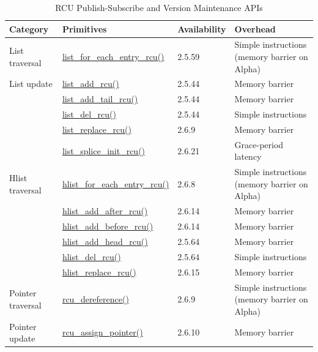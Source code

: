 \begin{table}[tb]
\begin{center}
\begin{tabular}{p{1.1in}|p{1.9in}|p{0.7in}|p{1.3in}}
Category &
	Primitives &
		Availability &
			Overhead \\
\hline
\hline
List traversal &
	\url{list_for_each_entry_rcu()} &
		2.5.59 &
			{ \raggedright
			  Simple instructions (memory barrier on Alpha) } \\
\hline
List update &
	\url{list_add_rcu()} &
		2.5.44 &
			Memory barrier \\
&
	\url{list_add_tail_rcu()} &
		2.5.44 &
			Memory barrier \\
&
	\url{list_del_rcu()} &
		2.5.44 &
			Simple instructions \\
&
	\url{list_replace_rcu()} &
		2.6.9 &
			Memory barrier \\
&
	\url{list_splice_init_rcu()} &
		2.6.21 &
			Grace-period latency \\
\hline
Hlist traversal &
	\url{hlist_for_each_entry_rcu()} &
		2.6.8 &
			{ \raggedright
			  Simple instructions (memory barrier on Alpha) } \\
&
	\url{hlist_add_after_rcu()} &
		2.6.14 &
			Memory barrier \\
&
	\url{hlist_add_before_rcu()} &
		2.6.14 &
			Memory barrier \\
&
	\url{hlist_add_head_rcu()} &
		2.5.64 &
			Memory barrier \\
&
	\url{hlist_del_rcu()} &
		2.5.64 &
			Simple instructions \\
&
	\url{hlist_replace_rcu()} &
		2.6.15 &
			Memory barrier \\
\hline
Pointer traversal &
	\url{rcu_dereference()} &
		2.6.9 &
			{ \raggedright
			  Simple instructions (memory barrier on Alpha) } \\
\hline
Pointer update &
	\url{rcu_assign_pointer()} &
		2.6.10 &
			Memory barrier \\
\end{tabular}
\end{center}
\caption{RCU Publish-Subscribe and Version Maintenance APIs}
\label{tab:defer:RCU Publish-Subscribe and Version Maintenance APIs}
\end{table}

